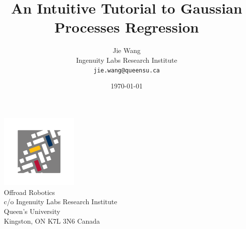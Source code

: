 \documentclass[12pt,letterpaper,fleqn,oneside,titlepage]{offroad-report}
\begin{document}
\pagestyle{plain}


\title{\bf An Intuitive Tutorial to Gaussian Processes Regression}
\author{Jie Wang \\ 
        Ingenuity Labs Research Institute \\ 
        \texttt{jie.wang@queensu.ca}}
\date{\today}

\maketitle
\thispagestyle{empty}

\begin{center}
\includegraphics[width=1.5in]{figs/offroad-icon.pdf} \\ \vspace{12pt}
\large
Offroad Robotics \\
c/o Ingenuity Labs Research Institute \\ 
Queen's University \\
Kingston, ON K7L 3N6 Canada
\end{center}


\thispagestyle{empty}

\end{document}
